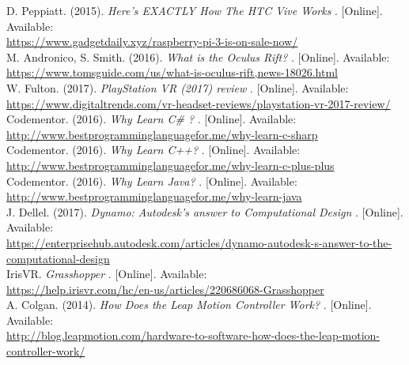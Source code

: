 \documentclass[letterpaper,10pt,onecolumn,compsoc]{IEEEtran}
\begin{document}
\begin{thebibliography}{9}

D. Peppiatt. (2015). 
\textit{Here's EXACTLY How The HTC Vive Works} 
. [Online]. Available: 
\\\url{https://www.gadgetdaily.xyz/raspberry-pi-3-is-on-sale-now/}
\\
M. Andronico, S. Smith. (2016). 
\textit{What is the Oculus Rift?} 
. [Online]. Available: 
\\\url{https://www.tomsguide.com/us/what-is-oculus-rift,news-18026.html}
\\
W. Fulton. (2017). 
\textit{PlayStation VR (2017) review} 
. [Online]. Available: 
\\\url{https://www.digitaltrends.com/vr-headset-reviews/playstation-vr-2017-review/}
\\
Codementor. (2016). 
\textit{Why Learn C\# ?} 
. [Online]. Available: 
\\\url{http://www.bestprogramminglanguagefor.me/why-learn-c-sharp}
\\
Codementor. (2016). 
\textit{Why Learn C++?} 
. [Online]. Available: 
\\\url{http://www.bestprogramminglanguagefor.me/why-learn-c-plus-plus}
\\
Codementor. (2016). 
\textit{Why Learn Java?} 
. [Online]. Available: 
\\\url{http://www.bestprogramminglanguagefor.me/why-learn-java}
\\
J. Dellel. (2017). 
\textit{Dynamo: Autodesk's answer to Computational Design} 
. [Online]. Available: 
\\\url{https://enterprisehub.autodesk.com/articles/dynamo-autodesk-s-answer-to-the-computational-design}
\\
IrisVR. 
\textit{Grasshopper} 
. [Online]. Available: 
\\\url{https://help.irisvr.com/hc/en-us/articles/220686068-Grasshopper}
\\
A. Colgan. (2014). 
\textit{How Does the Leap Motion Controller Work?} 
. [Online]. Available: 
\\\url{http://blog.leapmotion.com/hardware-to-software-how-does-the-leap-motion-controller-work/}


\end{thebibliography}
\end{document}
